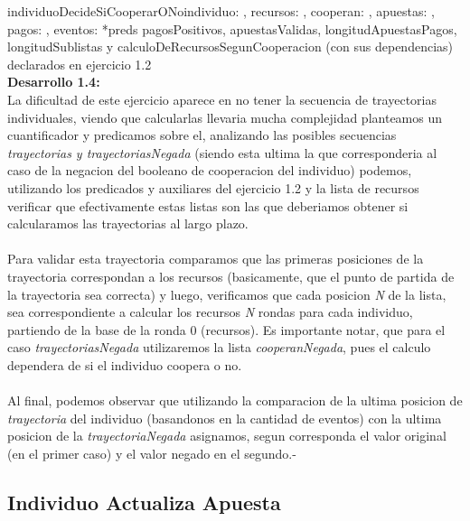 \documentclass[10pt,a4paper]{article}
\begin{document}
\begin{proc}{individuoDecideSiCooperarONo}{\In individuo: \nat, \In recursos: \TLista{\float}, \Inout cooperan: \TLista{\bool}, \In apuestas: \TLista{\TLista{\float}}, \In pagos: \TLista{\float}, \In eventos: \TLista{\TLista{\nat}}}{}
    *preds pagosPositivos, apuestasValidas, longitudApuestasPagos, longitudSublistas y calculoDeRecursosSegunCooperacion (con sus dependencias) declarados en ejercicio 1.2
\\
\textbf{Desarrollo 1.4:}
\\
 La dificultad de este ejercicio aparece en no tener la secuencia de trayectorias individuales, viendo que calcularlas llevaria mucha complejidad planteamos un cuantificador y predicamos sobre el, analizando las posibles secuencias \textit{trayectorias y trayectoriasNegada} (siendo esta ultima la que corresponderia al caso de la negacion del booleano de cooperacion del individuo) podemos, utilizando los predicados y auxiliares del ejercicio 1.2 y la lista de recursos verificar que efectivamente estas listas son las que deberiamos obtener si calcularamos las trayectorias al largo plazo. \\ \\
Para validar esta trayectoria comparamos que las primeras posiciones de la trayectoria correspondan a los recursos (basicamente, que el punto de partida de la trayectoria sea correcta) y luego, verificamos que cada posicion \textit{N} de la lista, sea correspondiente a calcular los recursos \textit{N} rondas para cada individuo, partiendo de la base de la ronda 0 (recursos). Es importante notar, que para el caso \textit{trayectoriasNegada} utilizaremos la lista \textit{cooperanNegada}, pues el calculo dependera de si el individuo coopera o no.
\\ \\
Al final, podemos observar que utilizando la comparacion de la ultima posicion de \textit{trayectoria} del individuo (basandonos en la cantidad de eventos) con la ultima posicion de la \textit{trayectoriaNegada} asignamos, segun corresponda el valor original (en el primer caso) y el valor negado en el segundo.-


\end{proc}

\subsection{Individuo Actualiza Apuesta}
\end{document}
